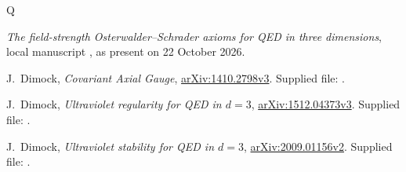 \documentclass[11pt]{article}
\numberwithin{equation}{section}
\begin{document}
\begin{thebibliography}{Q}
\raggedright
{}
\emph{The field-strength Osterwalder--Schrader axioms for QED in three
dimensions}, local manuscript , as present on
22 October 2026.

J.~Dimock, \emph{Covariant Axial Gauge},
\href{https://arxiv.org/abs/1410.2798v3}{arXiv:1410.2798v3}.
Supplied file: .

J.~Dimock, \emph{Ultraviolet regularity for QED in $d=3$},
\href{https://arxiv.org/abs/1512.04373v3}{arXiv:1512.04373v3}.
Supplied file: .

J.~Dimock, \emph{Ultraviolet stability for QED in $d=3$},
\href{https://arxiv.org/abs/2009.01156v2}{arXiv:2009.01156v2}.
Supplied file: .
\end{thebibliography}
\end{document}
